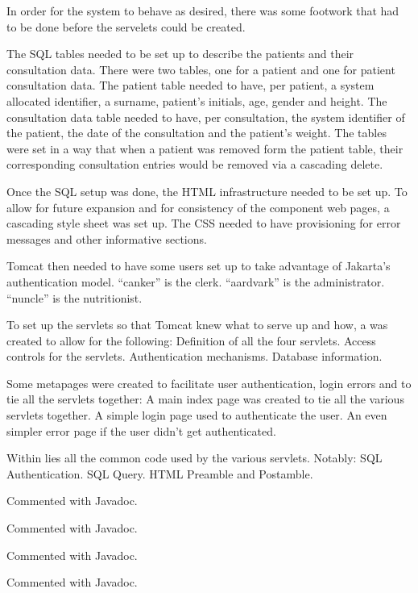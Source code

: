 
\items In order for the system to behave as desired, there was some footwork that had to be done before the servelets could be created.

\items The SQL tables needed to be set up to describe the patients and their consultation data.
\subitems There were two tables, one for a patient and one for patient consultation data.
\subitems The patient table needed to have, per patient, a system allocated identifier, a surname, patient's initials, age, gender and height.
\subitems The consultation data table needed to have, per consultation, the system identifier of the patient, the date of the consultation and the patient's weight.
\subitems The tables were set in a way that when a patient was removed form the patient table, their corresponding consultation entries would be removed via a cascading delete.

\items Once the SQL setup was done, the HTML infrastructure needed to be set up. To allow for future expansion and for consistency of the component web pages, a cascading style sheet was set up.
\subitems The CSS needed to have provisioning for error messages and other informative sections.

\items Tomcat then needed to have some users set up to take advantage of Jakarta's authentication model.
\subitems ``canker'' is the clerk.
\subitems ``aardvark'' is the administrator.
\subitems ``nuncle'' is the nutritionist.

\items To set up the servlets so that Tomcat knew what to serve up and how, a  was created to allow for the following:
\subitems Definition of all the four servlets.
\subitems Access controls for the servlets.
\subitems Authentication mechanisms.
\subitems Database information.

\items Some metapages were created to facilitate user authentication, login errors and to tie all the servlets together:
\subitems A main index page was created to tie all the various servlets together.
\subitems A simple login page used to authenticate the user.
\subitems An even simpler error page if the user didn't get authenticated.

\items Within lies all the common code used by the various servlets. Notably:
\subitems SQL Authentication.
\subitems SQL Query.
\subitems HTML Preamble and Postamble.

\items Commented with Javadoc.

\items Commented with Javadoc.

\items Commented with Javadoc.

\items Commented with Javadoc.

\bye
